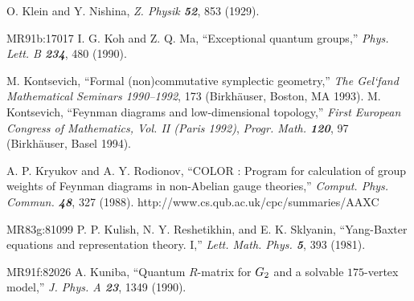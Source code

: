 O. Klein and Y. Nishina,
        {\em Z. Physik  \bf 52}, 853 (1929).

        {MR91b:17017}   I. G. Koh and Z. Q. Ma,
        ``Exceptional quantum groups,''
        {\em Phys. Lett. B  \bf 234}, 480 (1990). %


 M. Kontsevich,
``Formal (non)commutative symplectic geometry,''
{\em  The Gel`fand Mathematical Seminars 1990--1992}, 173
  (Birkh{\"a}user, Boston, MA 1993).
 M. Kontsevich,
``Feynman diagrams and low-dimensional topology,''
{\em  First European Congress of Mathematics, Vol. II (Paris 1992)},
 {\em Progr. Math. \bf 120}, 97
(Birkh{\"a}user, Basel 1994). %
%


A. P. Kryukov and A. Y. Rodionov,
``{COLOR} : Program for calculation of group weights of {Feynman}
diagrams in non-{Abelian} gauge theories,''
{\em Comput.  Phys.  Commun.    \bf 48}, 327 (1988).
http://www.cs.qub.ac.uk/cpc/summaries/AAXC


        {MR83g:81099}
P. P. Kulish, N. Y. Reshetikhin, and E. K. Sklyanin, ``Yang-Baxter
  equations and representation theory. I,''
{\em Lett. Math. Phys. \bf 5}, 393 (1981). %

        {MR91f:82026} A. Kuniba,
``Quantum $R$-matrix for $G\sb 2$ and a solvable $175$-vertex model,''
{\em J. Phys. A  \bf 23}, 1349 (1990). %



